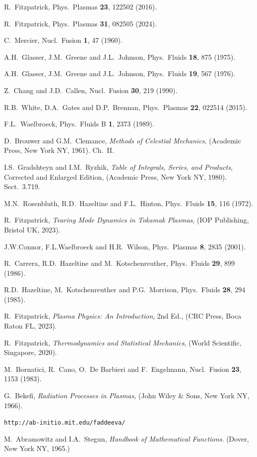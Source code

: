 \documentclass[12pt,prb,aps]{revtex4-1}
\begin{document}
\begin{thebibliography}{99}
 R.~Fitzpatrick, Phys.\ Plasmas {\bf 23}, 122502 (2016).

 R.~Fitzpatrick, Phys.\ Plasmas {\bf 31}, 082505 (2024).

 C.~Mercier, Nucl.\ Fusion {\bf 1}, 47 (1960).

 A.H.~Glasser, J.M.~Greene and J.L.~Johnson, Phys.\ Fluids {\bf 18}, 875 (1975).

 A.H.~Glasser, J.M.~Greene  and J.L.~Johnson, Phys.\ Fluids {\bf 19}, 567 (1976).

 Z.~Chang and J.D.~Callen,  Nucl.\ Fusion {\bf 30}, 219 (1990).

 R.B.~White, D.A.~Gates and D.P.~Brennan, Phys.\ Plasmas {\bf 22}, 022514 (2015). 

 F.L.~Waelbroeck, Phys.\ Fluids B {\bf 1}, 2373 (1989).

 D.~Brouwer and G.M.~Clemance, {\em Methods of Celestial Mechanics}, (Academic Press, New York NY, 1961).  Ch.~II.

 I.S.~Gradshteyn and I.M.~Ryzhik, {\em Table of Integrals, Series, and Products}, Corrected and Enlarged Edition, (Academic Press, New York NY, 1980). Sect.~3.719.

 M.N.~Rosenbluth, R.D.~Hazeltine and F.L.~Hinton, Phys.\ Fluids {\bf 15}, 116 (1972).

 R.~Fitzpatrick, {\em Tearing Mode Dynamics in Tokamak Plasmas}, (IOP Publishing, Bristol UK, 2023).

 J.W.Connor,  F.L.Waelbroeck and  H.R.~Wilson, Phys.\ Plasmas {\bf 8}, 2835 (2001). 

 R.~Carrera, R.D.~Hazeltine and M.~Kotschenreuther, Phys.\ Fluids {\bf 29}, 899 (1986). 

 R.D.~Hazeltine, M.~Kotschenreuther and P.G.~Morrison, Phys.\ Fluids {\bf 28}, 294 (1985). 

 R.~Fitzpatrick, {\em Plasma Physics: An Introduction}, 2nd Ed., (CRC Press, Boca Raton FL, 2023).

 R.~Fitzpatrick, {\em Thermodynamics and Statistical Mechanics}, (World Scientific, Singapore,  2020).

 M.~Bornatici, R.~Cano, O.\ De Barbieri and F.~Engelmann, Nucl.\ Fusion {\bf 23}, 1153 (1983).

 G.~Bekefi, {\em Radiation Processes in Plasmas}, (John Wiley \& Sons, New York NY, 1966).

 {\tt http://ab-initio.mit.edu/faddeeva/}

 M.~Abramowitz and I.A.~Stegun, {\em Handbook of Mathematical Functions}. (Dover, New York NY, 1965.)

\end{thebibliography}
\end{document}
